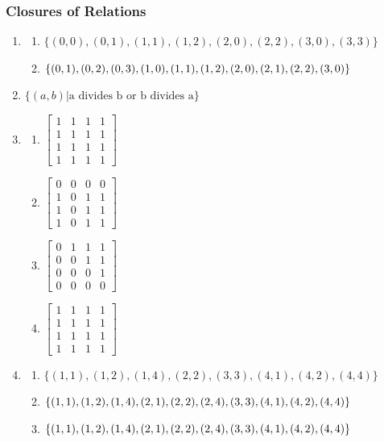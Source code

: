 \documentclass{sig-alternate-05-2015}
\begin{document}
\subsubsection{Closures of Relations}
\begin{enumerate}
\item 
	\begin{enumerate}
		\item $\{(0, 0), (0, 1), (1, 1), (1, 2), (2, 0), (2, 2), (3, 0), (3, 3)\}$
		\item $\{(0, 1), (0, 2), (0, 3), (1, 0), (1, 1), (1, 2), (2, 0), (2, 1),\\
			(2, 2), (3, 0)\}$
	\end{enumerate}

\item
$\{(a, b) | \text{a divides b or b divides a}\}$	

\item
	\begin{enumerate}
		\item 
		$\begin{bmatrix}
		1 & 1 & 1 & 1\\
		1 & 1 & 1 & 1\\
		1 & 1 & 1 & 1\\
		1 & 1 & 1 & 1
		\end{bmatrix}$
		\item
		$\begin{bmatrix}
		0 & 0 & 0 & 0\\
		1 & 0 & 1 & 1\\
		1 & 0 & 1 & 1\\
		1 & 0 & 1 & 1
		\end{bmatrix}$
		\item
		$\begin{bmatrix}
		0 & 1 & 1 & 1\\
		0 & 0 & 1 & 1\\
		0 & 0 & 0 & 1\\
		0 & 0 & 0 & 0
		\end{bmatrix}$
		\item
		$\begin{bmatrix}
		1 & 1 & 1 & 1\\
		1 & 1 & 1 & 1\\
		1 & 1 & 1 & 1\\
		1 & 1 & 1 & 1
		\end{bmatrix}$		
	\end{enumerate}

\item
	\begin{enumerate}
		\item $\{(1, 1), (1, 2),
			(1, 4), (2, 2), (3, 3), (4, 1), (4, 2), (4, 4)\}$
		\item $\{(1, 1),(1, 2), (1, 4), (2, 1), (2, 2), (2, 4),\\ (3, 3), (4, 1), (4, 2),
			(4, 4)\}$
		\item $\{(1, 1), (1, 2), (1, 4), (2, 1), (2, 2), (2, 4),\\ (3, 3),
			(4, 1), (4, 2), (4, 4)\}$
	\end{enumerate}


\end{enumerate}
\end{document}
